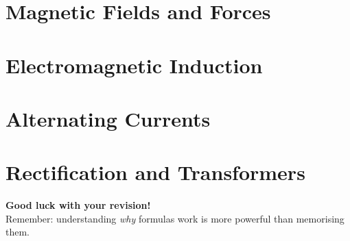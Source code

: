 

\section{Magnetic Fields and Forces}



\section{Electromagnetic Induction}



\section{Alternating Currents}



\section{Rectification and Transformers}


\begin{motivationbox}
\centering
\textbf{\color{darkblue}Good luck with your revision!}\\[0.2em]
{\color{darkgray}\small Remember: understanding \emph{why} formulas work is more powerful than memorising them.}
\end{motivationbox}
